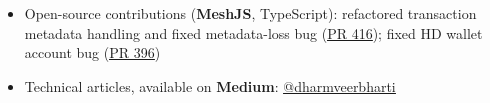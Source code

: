 \documentclass[]{resume-openfont-compact}
\newcommand{\weblink}[2]{\href{#2}{\underline{#1}}}
\begin{document}
\begin{itemize}
    \item Open-source contributions (\textbf{MeshJS}, TypeScript): refactored transaction metadata handling and fixed metadata-loss bug (\weblink{PR 416}{https://github.com/MeshJS/mesh/pull/416}); fixed HD wallet account bug (\weblink{PR 396}{https://github.com/MeshJS/mesh/pull/396})
    \item Technical articles, available on \textbf{Medium}: \weblink{@dharmveerbharti}{https://medium.com/@dharmveerbharti}

\end{itemize}
\end{document}
